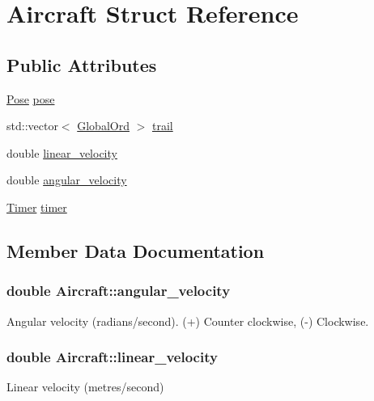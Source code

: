 \hypertarget{structAircraft}{}\section{Aircraft Struct Reference}
\label{structAircraft}
\subsection*{Public Attributes}
\begin{DoxyCompactItemize}
\item 
\hyperlink{structPose}{Pose} \hyperlink{structAircraft_ae974de419f4b2570b0d4416e5e5aeac3}{pose}
\item 
std\+::vector$<$ \hyperlink{structGlobalOrd}{Global\+Ord} $>$ \hyperlink{structAircraft_a11f949f7f9f22bae298b9c821fccf928}{trail}
\item 
double \hyperlink{structAircraft_a892016ca5094e6c5bf0fb79c94310e76}{linear\+\_\+velocity}
\item 
double \hyperlink{structAircraft_a2047bb7d3321d300cc3afb2753ff0f49}{angular\+\_\+velocity}
\item 
\hyperlink{classTimer}{Timer} \hyperlink{structAircraft_a256a704e2dbf859d95d4eb28b0e02aa3}{timer}
\end{DoxyCompactItemize}


\subsection{Member Data Documentation}
\subsubsection[{\texorpdfstring{angular\+\_\+velocity}{angular_velocity}}]{\setlength{\rightskip}{0pt plus 5cm}double Aircraft\+::angular\+\_\+velocity}\hypertarget{structAircraft_a2047bb7d3321d300cc3afb2753ff0f49}{}\label{structAircraft_a2047bb7d3321d300cc3afb2753ff0f49}
Angular velocity (radians/second). (+) Counter clockwise, (-\/) Clockwise. 
\subsubsection[{\texorpdfstring{linear\+\_\+velocity}{linear_velocity}}]{\setlength{\rightskip}{0pt plus 5cm}double Aircraft\+::linear\+\_\+velocity}\hypertarget{structAircraft_a892016ca5094e6c5bf0fb79c94310e76}{}\label{structAircraft_a892016ca5094e6c5bf0fb79c94310e76}
Linear velocity (metres/second) 
